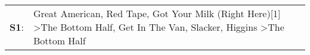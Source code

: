 \begin{supertabular}{p{0.03\textwidth}p{0.92\textwidth}}
 \textbf{S1}:  &  Great American\textsuperscript{}, \enspace Red Tape\textsuperscript{}, \enspace Got Your Milk (Right Here)[1]\textsuperscript{} \textgreater \enspace The Bottom Half\textsuperscript{}, \enspace Get In The Van\textsuperscript{}, \enspace Slacker\textsuperscript{}, \enspace Higgins\textsuperscript{} \textgreater \enspace The Bottom Half\textsuperscript{}  \enspace  \\
\end{supertabular}
